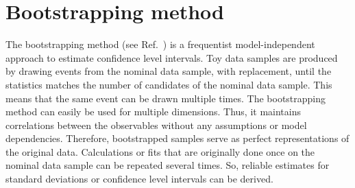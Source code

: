 
\section{Bootstrapping method}
\label{sec:dataanalysis:bootstrapping}

The bootstrapping method (see \eg Ref.~\cite{Behnke:2013pga}) is a frequentist
model-independent approach to estimate confidence level intervals. Toy data
samples are produced by drawing events from the nominal data sample, with
replacement, until the statistics matches the number of candidates of the
nominal data sample. This means that the same event can be drawn multiple
times. The bootstrapping method can easily be used for multiple dimensions.
Thus, it maintains correlations between the observables without any
assumptions or model dependencies. Therefore, bootstrapped samples serve as
perfect representations of the original data. Calculations or fits that are
originally done once on the nominal data sample can be repeated several times.
So, reliable estimates for standard deviations or confidence level intervals
can be derived.
